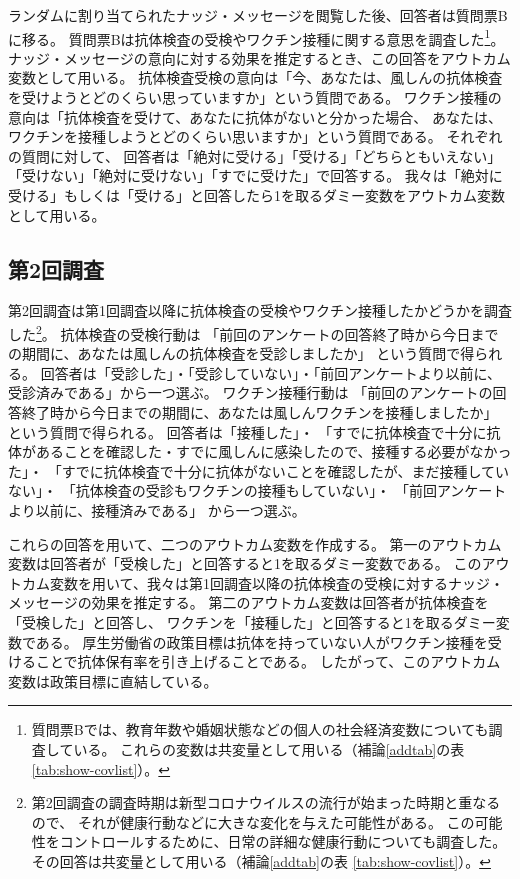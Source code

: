\documentclass[
  11pt,
  a4paper,
]{article}
\begin{document}
ランダムに割り当てられたナッジ・メッセージを閲覧した後、回答者は質問票Bに移る。
質問票Bは抗体検査の受検やワクチン接種に関する意思を調査した\footnote{質問票Bでは、教育年数や婚姻状態などの個人の社会経済変数についても調査している。
  これらの変数は共変量として用いる（補論\ref{addtab}の表 \ref{tab:show-covlist}）。}。
ナッジ・メッセージの意向に対する効果を推定するとき、この回答をアウトカム変数として用いる。
抗体検査受検の意向は「今、あなたは、風しんの抗体検査を受けようとどのくらい思っていますか」という質問である。
ワクチン接種の意向は「抗体検査を受けて、あなたに抗体がないと分かった場合、
あなたは、ワクチンを接種しようとどのくらい思いますか」という質問である。
それぞれの質問に対して、
回答者は「絶対に受ける」「受ける」「どちらともいえない」「受けない」「絶対に受けない」「すでに受けた」で回答する。
我々は「絶対に受ける」もしくは「受ける」と回答したら1を取るダミー変数をアウトカム変数として用いる。

\hypertarget{wave2}{%
\subsection{第2回調査}\label{wave2}}

第2回調査は第1回調査以降に抗体検査の受検やワクチン接種したかどうかを調査した\footnote{第2回調査の調査時期は新型コロナウイルスの流行が始まった時期と重なるので、
  それが健康行動などに大きな変化を与えた可能性がある。
  この可能性をコントロールするために、日常の詳細な健康行動についても調査した。
  その回答は共変量として用いる（補論\ref{addtab}の表 \ref{tab:show-covlist}）。}。
抗体検査の受検行動は
「前回のアンケートの回答終了時から今日までの期間に、あなたは風しんの抗体検査を受診しましたか」
という質問で得られる。
回答者は「受診した」・「受診していない」・「前回アンケートより以前に、受診済みである」から一つ選ぶ。
ワクチン接種行動は
「前回のアンケートの回答終了時から今日までの期間に、あなたは風しんワクチンを接種しましたか」
という質問で得られる。
回答者は「接種した」・
「すでに抗体検査で十分に抗体があることを確認した・すでに風しんに感染したので、接種する必要がなかった」・
「すでに抗体検査で十分に抗体がないことを確認したが、まだ接種していない」・
「抗体検査の受診もワクチンの接種もしていない」・
「前回アンケートより以前に、接種済みである」
から一つ選ぶ。

これらの回答を用いて、二つのアウトカム変数を作成する。
第一のアウトカム変数は回答者が「受検した」と回答すると1を取るダミー変数である。
このアウトカム変数を用いて、我々は第1回調査以降の抗体検査の受検に対するナッジ・メッセージの効果を推定する。
第二のアウトカム変数は回答者が抗体検査を「受検した」と回答し、
ワクチンを「接種した」と回答すると1を取るダミー変数である。
厚生労働省の政策目標は抗体を持っていない人がワクチン接種を受けることで抗体保有率を引き上げることである。
したがって、このアウトカム変数は政策目標に直結している。
\end{document}
